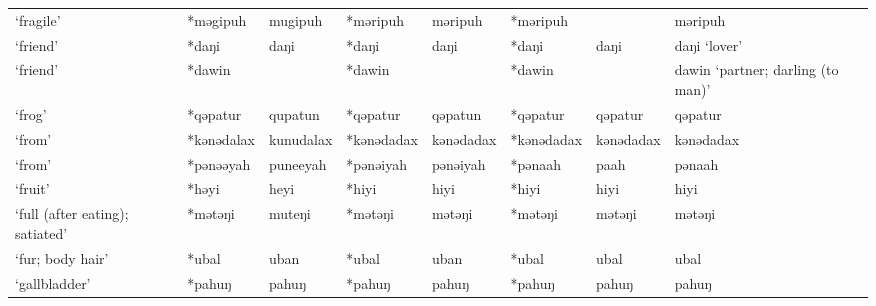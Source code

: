 \begin{landscape}
\begin{longtable}[c]{@{}p{3cm}<{\raggedright}p{2.75cm}<{\raggedright}p{2.75cm}<{\raggedright}p{2.75cm}<{\raggedright}p{2.75cm}<{\raggedright}p{2.75cm}<{\raggedright}p{2.75cm}<{\raggedright}p{2.75cm}<{\raggedright}@{}}
`fragile'                                            & *məgipuh           & mugipuh                        & *məripuh           & məripuh                    & *məripuh         &                          & məripuh                           \\
`friend'                                             & *daŋi              & daŋi                           & *daŋi              & daŋi                       & *daŋi            & daŋi                     & daŋi `lover'                      \\
`friend'                                             & *dawin             &                                & *dawin             &                            & *dawin           &                          & dawin `partner; darling (to man)' \\
`frog'                                               & *qəpatur           & qupatun                        & *qəpatur           & qəpatun                    & *qəpatur         & qəpatur                  & qəpatur                           \\
`from'                                               & *kənədalax         & kunudalax                      & *kənədadax         & kənədadax                  & *kənədadax       & kənədadax                & kənədadax                         \\
`from'                                               & *pənəəyah          & puneeyah                       & *pənəiyah          & pənəiyah                   & *pənaah          & paah                     & pənaah                            \\
`fruit'                                              & *həyi              & heyi                           & *hiyi              & hiyi                       & *hiyi            & hiyi                     & hiyi                              \\
`full (after eating); satiated'                      & *mətəŋi            & muteŋi                         & *mətəŋi            & mətəŋi                     & *mətəŋi          & mətəŋi                   & mətəŋi                            \\
`fur; body hair'                                     & *ubal              & uban                           & *ubal              & uban                       & *ubal            & ubal                     & ubal                              \\
`gallbladder'                                        & *pahuŋ             & pahuŋ                          & *pahuŋ             & pahuŋ                      & *pahuŋ           & pahuŋ                    & pahuŋ                             \\

\end{longtable}
\end{landscape}
